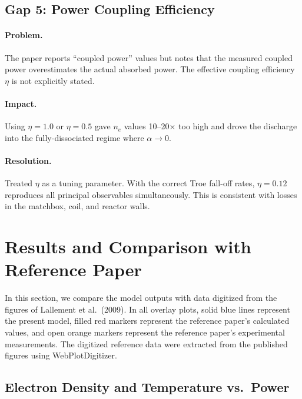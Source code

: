 \documentclass[11pt,a4paper]{article}
\newcommand{\ne}{n_e}
\begin{document}
\subsection{Gap 5: Power Coupling Efficiency}

\paragraph{Problem.} The paper reports ``coupled power'' values but notes that the measured coupled power overestimates the actual absorbed power.  The effective coupling efficiency $\eta$ is not explicitly stated.

\paragraph{Impact.} Using $\eta = 1.0$ or $\eta = 0.5$ gave $\ne$ values 10--20$\times$ too high and drove the discharge into the fully-dissociated regime where $\alpha \to 0$.

\paragraph{Resolution.} Treated $\eta$ as a tuning parameter.  With the correct Troe fall-off rates, $\eta = 0.12$ reproduces all principal observables simultaneously.  This is consistent with losses in the matchbox, coil, and reactor walls.

\section{Results and Comparison with Reference Paper}

In this section, we compare the model outputs with data digitized from the figures of Lallement et al.\ (2009).  In all overlay plots, solid blue lines represent the present model, filled red markers represent the reference paper's calculated values, and open orange markers represent the reference paper's experimental measurements.  The digitized reference data were extracted from the published figures using WebPlotDigitizer.

\subsection{Electron Density and Temperature vs.\ Power}
\end{document}
